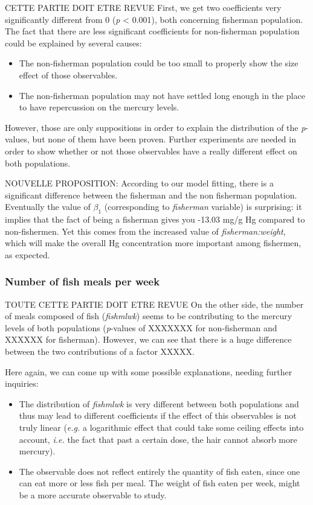\documentclass[12pt,]{article}
\providecommand{\tightlist}{%
  \setlength{\itemsep}{0pt}\setlength{\parskip}{0pt}}
\begin{document}
CETTE PARTIE DOIT ETRE REVUE First, we get two coefficients very
significantly different from 0 (\emph{p} \textless{} 0.001), both
concerning fisherman population. The fact that there are less
significant coefficients for non-fisherman population could be explained
by several causes:

\begin{itemize}
\tightlist
\item
  The non-fisherman population could be too small to properly show the
  size effect of those observables.
\item
  The non-fisherman population may not have settled long enough in the
  place to have repercussion on the mercury levels.
\end{itemize}

However, those are only suppositions in order to explain the
distribution of the \emph{p}-values, but none of them have been proven.
Further experiments are needed in order to show whether or not those
observables have a really different effect on both populations.

NOUVELLE PROPOSITION: According to our model fitting, there is a
significant difference between the fisherman and the non fisherman
population. Eventually the value of \(\beta_1\) (corresponding to
\emph{fisherman} variable) is surprising: it implies that the fact of
being a fisherman gives you -13.03 mg/g Hg compared to non-fishermen.
Yet this comes from the increased value of \emph{fisherman:weight},
which will make the overall Hg concentration more important among
fishermen, as expected.

\subsubsection{Number of fish meals per
week}\label{number-of-fish-meals-per-week}

TOUTE CETTE PARTIE DOIT ETRE REVUE On the other side, the number of
meals composed of fish (\emph{fishmlwk}) seems to be contributing to the
mercury levels of both populations (\emph{p}-values of XXXXXXX for
non-fisherman and XXXXXX for fisherman). However, we can see that there
is a huge difference between the two contributions of a factor XXXXX.

Here again, we can come up with some possible explanations, needing
further inquiries:

\begin{itemize}
\item
  The distribution of \emph{fishmlwk} is very different between both
  populations and thus may lead to different coefficients if the effect
  of this observables is not truly linear (\emph{e.g.} a logarithmic
  effect that could take some ceiling effects into account, \emph{i.e.}
  the fact that past a certain dose, the hair cannot absorb more
  mercury).
\item
  The observable does not reflect entirely the quantity of fish eaten,
  since one can eat more or less fish per meal. The weight of fish eaten
  per week, might be a more accurate observable to study.
\end{itemize}
\end{document}
